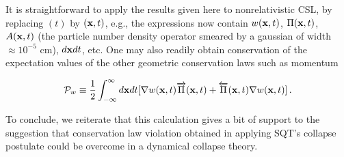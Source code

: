 \documentclass{article}
\begin{document}
	It is straightforward to apply the results given here to nonrelativistic CSL, 
by replacing $(t)$ by $({\bf x},t)$, e.g., the expressions now contain 
$w({\bf x},t)$, $\Pi({\bf x},t)$, 
$A({\bf x},t)$ (the particle number density operator smeared by a gaussian of width 
$\approx 10^{-5}$ cm), $d{\bf x}dt$, etc. One may also readily obtain conservation of the 
expectation values of the other geometric conservation laws such as momentum

\begin{displaymath}
{\cal P}_{w}\equiv \frac{1}{2}\int_{-\infty}^{\infty}d{\bf x}dt
[{\bf \nabla}w({\bf x},t)\overrightarrow{\Pi}({\bf x},t)+
\overleftarrow{\Pi}({\bf x},t){\bf \nabla}w({\bf x},t)]\,.
\end{displaymath} 

	To conclude, we reiterate that this calculation gives a bit of support to the 
suggestion that conservation law violation obtained in applying SQT's collapse 
postulate could be overcome in a dynamical collapse theory.  

\eject
\end{document}
